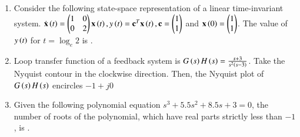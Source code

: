 \documentclass[journal,12pt,onecolumn]{IEEEtran}
\theoremstyle{remark}
\begin{document}
\begin{enumerate}[start=1, label=Q.\arabic*]
    \hfill{}

    \item Consider the following state-space representation of a linear time-invariant system.
    $\dot{\mathbf{x}}\left(t\right) = \begin{pmatrix}1 & 0 \\ 0 & 2\end{pmatrix}\mathbf{x}\left(t\right), y\left(t\right)= \mathbf{c}^T\mathbf{x}\left(t\right), \mathbf{c} = \begin{pmatrix}1 \\ 1\end{pmatrix}$ and $\mathbf{x}\left(0\right) = \begin{pmatrix}1 \\ 1\end{pmatrix}$.
    The value of $y\left(t\right)$ for $t = \log_e 2$ is \underline{\hspace{2cm}}.

    \hfill{}

    \item Loop transfer function of a feedback system is $G\left(s\right)H\left(s\right) = \frac{s+3}{s^2\left(s-3\right)}$. Take the Nyquist contour in the clockwise direction. Then, the Nyquist plot of $G\left(s\right)H\left(s\right)$ encircles $-1+j0$
    \begin{enumerate}
    \end{enumerate}

    \hfill{}

    \item Given the following polynomial equation
    $s^3 + 5.5s^2 + 8.5s + 3 = 0$,
    the number of roots of the polynomial, which have real parts strictly less than $-1$, is \underline{\hspace{2cm}}.

    \hfill{}


\end{enumerate}
\end{document}
